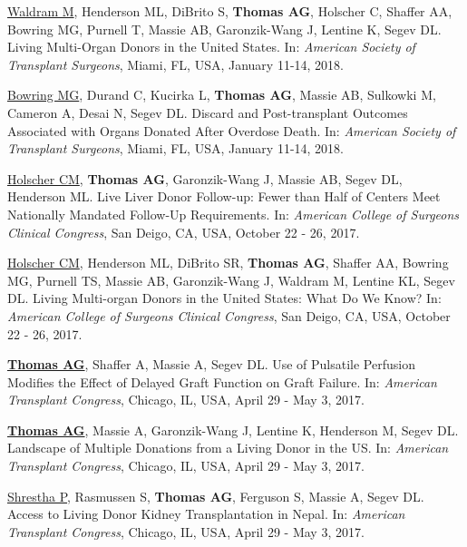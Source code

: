 \documentclass[10pt]{article}
\begin{document}
\begin{bibenum}
\item \underline{Waldram M}, Henderson ML, DiBrito S, \textbf{Thomas AG},
  Holscher C, Shaffer AA, Bowring MG, Purnell T, Massie AB,
  Garonzik-Wang J, Lentine K, Segev DL. Living Multi-Organ Donors in the
  United States.
  In: \emph{American Society of Transplant Surgeons},
  Miami, FL, USA, January 11-14, 2018.

\item \underline{Bowring MG}, Durand C, Kucirka L, \textbf{Thomas AG},
  Massie AB, Sulkowki M, Cameron A, Desai N, Segev DL.
  Discard and Post-transplant Outcomes Associated with Organs
  Donated After Overdose Death.
  In: \emph{American Society of Transplant Surgeons},
  Miami, FL, USA, January 11-14, 2018.

\item \underline{Holscher CM}, \textbf{Thomas AG}, Garonzik-Wang J,
  Massie AB, Segev DL, Henderson ML. Live Liver Donor Follow-up: Fewer
  than Half of Centers Meet Nationally Mandated Follow-Up Requirements.
  In: \emph{American College of Surgeons Clinical Congress},
  San Deigo, CA, USA, October 22 - 26, 2017.

\item \underline{Holscher CM}, Henderson ML, DiBrito SR, \textbf{Thomas AG},
  Shaffer AA, Bowring MG, Purnell TS, Massie AB, Garonzik-Wang J,
  Waldram M, Lentine KL, Segev DL. Living Multi-organ Donors in the
  United States: What Do We Know?
  In: \emph{American College of Surgeons Clinical Congress},
  San Deigo, CA, USA, October 22 - 26, 2017.

\item \underline{\textbf{Thomas AG}}, Shaffer A, Massie A, Segev DL.
  Use of Pulsatile Perfusion Modifies the Effect of
  Delayed Graft Function on Graft Failure.
  In: \emph{American Transplant Congress},
  Chicago, IL, USA, April 29 - May 3, 2017.

\item \underline{\textbf{Thomas AG}}, Massie A, Garonzik-Wang J,
  Lentine K, Henderson M, Segev DL.
  Landscape of Multiple Donations from a Living Donor in the US.
  In: \emph{American Transplant Congress},
  Chicago, IL, USA, April 29 - May 3, 2017.

\item \underline{Shrestha P}, Rasmussen S, \textbf{Thomas AG},
  Ferguson S, Massie A, Segev DL.
  Access to Living Donor Kidney Transplantation in Nepal.
  In: \emph{American Transplant Congress},
  Chicago, IL, USA, April 29 - May 3, 2017.


\end{bibenum}
\end{document}
